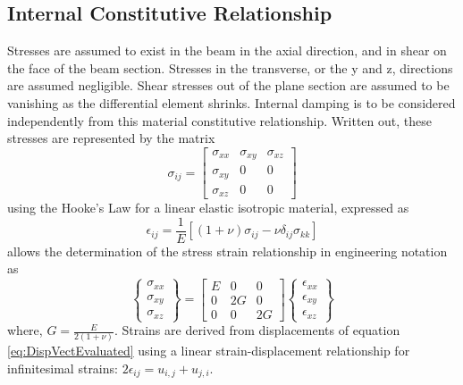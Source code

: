 \subsection{Internal Constitutive Relationship} \label{Internal Constitutive Relationship}
Stresses are assumed to exist in the beam in the axial direction, and in shear on the face of the beam section. Stresses in the transverse, or the y and z, directions are assumed negligible. Shear stresses out of the plane section are assumed to be vanishing as the differential element shrinks. Internal damping is to be considered independently from this material constitutive relationship. Written out, these stresses are represented by the matrix
\begin{equation}\label{key}
\sigma_{ij}=\left[\begin{array}{ccc}
\sigma_{xx}&\sigma_{xy}&\sigma_{xz}\\
\sigma_{xy}&0&0\\
\sigma_{xz}&0&0
\end{array}\right]
\end{equation}
using the Hooke's Law for a linear elastic isotropic material, expressed as
\begin{equation}\label{key}
\epsilon_{ij}=\frac{1}{E}[(1+\nu)\sigma_{ij}-\nu\delta_{ij}\sigma_{kk}]
\end{equation}
allows the determination of the stress strain relationship in engineering notation as
\begin{equation}\label{eq:ConstitutiveRelationshipEngineeringNotation}
\left\{\begin{array}{c}
\sigma_{xx}\\ \sigma_{xy}\\ \sigma_{xz}
\end{array}\right\} = \left[\begin{array}{ccc}
E&0&0\\0&2G&0\\0&0&2G
\end{array}\right] \left\{\begin{array}{c}
\epsilon_{xx}\\ \epsilon_{xy}\\ \epsilon_{xz}
\end{array}\right\}
\end{equation}
where, $ G=\frac{E}{2(1+\nu)} $. Strains are derived from displacements of equation \eqref{eq:DispVectEvaluated} using a linear strain-displacement relationship for infinitesimal strains: $ 2\epsilon_{ij}=u_{i,j}+u_{j,i} $.

